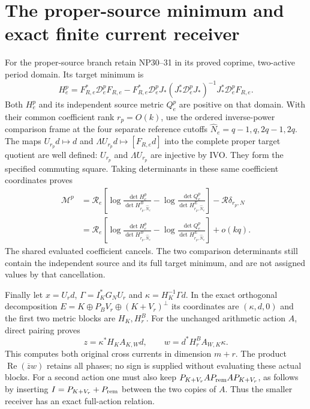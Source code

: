 \documentclass[11pt]{article}
\begin{document}
\section{The proper-source minimum and exact finite current receiver}
For the proper-source branch retain NP30--31 \cite{NP} in its
proved coprime, two-active period domain. Its target minimum is
\[
H_e^p=F_{R,e}^*\mathcal D_e^pF_{R,e}
-F_{R,e}^*\mathcal D_e^pJ_*
(J_*^*\mathcal D_e^pJ_*)^{-1}J_*^*\mathcal D_e^pF_{R,e}.
\]
Both $H_e^p$ and its independent source metric $Q_e^p$ are positive
on that domain. With their common coefficient rank $r_p=O(k)$,
use the ordered inverse-power comparison frame at the four
separate reference cutoffs $\widehat N_e=q-1,q,2q-1,2q$.
The maps $U_{r_p}d\mapsto d$ and
$\Lambda U_{r_p}d\mapsto[F_{R,e}d]$ into the complete proper
target quotient are well defined: $U_{r_p}$ and $\Lambda U_{r_p}$
are injective by IVO. They form the specified commuting square.
Taking determinants in these same coefficient coordinates proves
\[
\begin{split}
\mathcal M^p
&=\mathcal R_e\left[
\log\frac{\det H_e^p}{\det H^B_{r_p,\widehat N_e}}
-\log\frac{\det Q_e^p}{\det H^E_{r_p,\widehat N_e}}\right]
-\mathcal R\delta_{r_p,N}\\
&=\mathcal R_e\left[
\log\frac{\det H_e^p}{\det H^B_{r_p,\widehat N_e}}
-\log\frac{\det Q_e^p}{\det H^E_{r_p,\widehat N_e}}\right]+o(kq).
\end{split}\tag{IQR20}
\]
The shared evaluated coefficient cancels. The two comparison
determinants still contain the independent source and its full target
minimum, and are not assigned values by that cancellation.

Finally let $x=U_rd$, $\Gamma=I_K^*G_NU_r$ and
$\kappa=H_K^{-1}\Gamma d$.
In the exact orthogonal decomposition
$E=K\oplus P_BV_r\oplus(K+V_r)^\perp$ its coordinates are
$(\kappa,d,0)$ and the first two metric blocks are $H_K,H^B_r$.
For the unchanged arithmetic action $A$, direct pairing proves
\[
z=\kappa^*H_KA_{K,W}d,\qquad
w=d^*H^B_rA_{W,K}\kappa.
\tag{IQR21}
\]
This computes both original cross currents in dimension $m+r$.
The product $\operatorname{Re}(\overline zw)$ retains all phases;
no sign is supplied without evaluating these actual blocks.
For a second action one must also keep
$P_{K+V_r}AP_{\rm rem}AP_{K+V_r}$, as follows by inserting
$I=P_{K+V_r}+P_{\rm rem}$ between the two copies of $A$.
Thus the smaller receiver has an exact full-action relation.
\end{document}
